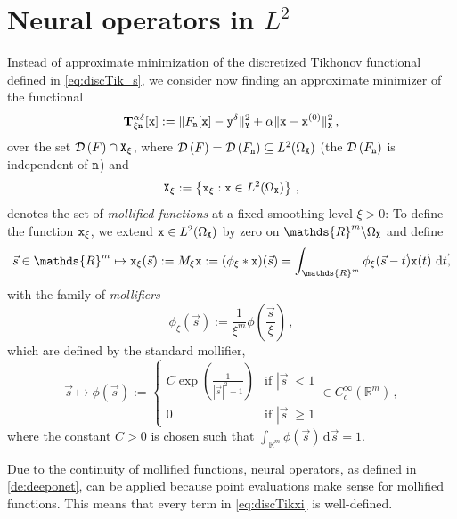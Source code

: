\documentclass[10pt]{article}
\numberwithin{equation}{section}
\theoremstyle{nonumberplain}
\newcommand{\R}{\mathds{R}}
\newcommand{\dom}[1]{\mathcal{D}\left(#1\right)}
\newcommand{\norms}[1]{\|#1\|}
\newcommand{\set}[1]{\left\{#1\right\}}
\renewcommand{\d}{\,\mathrm d}
\newcommand{\bs}{\vec{s}}
\newcommand{\bt}{\vec{t}}
\newcommand{\X}{{\tt X}}
\newcommand{\Y}{{\tt Y}}
\newcommand{\y}{{\tt y}}
\newcommand{\yd}{\y^\delta}
\newcommand{\n}{{\tt n}}
\newcommand{\x}{{\tt x}}
\newcommand{\Tik}{\mathbf{T}}
\begin{document}
\section{Neural operators in $L^2$} \label{se:generalization}
Instead of approximate minimization of the discretized Tikhonov functional defined in \autoref{eq:discTik_s}, we consider now finding an approximate minimizer of the functional
\begin{equation} \label{eq:discTikxi}
	\Tik_{\xi\n}^{\alpha\delta}[\x] := \norms{F_\n[\x]-\yd}_\Y^2 + \alpha\norms{\x-\x^{(0)}}^2_{\X}\,,
\end{equation} 
over the set $\dom{F} \cap \X_\xi$, where $\dom{F} = \dom{F_\n} \subseteq L^2(\Omega_\X)$ (the $\dom{F_\n}$ is independent of $\n$) and 
\begin{equation*}
	\X_\xi := \set{\x_\xi: \x \in L^2(\Omega_\X)}\,,
\end{equation*}
denotes the set of \emph{mollified functions} at a fixed smoothing level $\xi > 0$: To define the function $\x_\xi$, we extend $\x \in L^2(\Omega_\X)$ by zero on $\R^m\backslash\Omega_\X$ and define
\begin{equation}\label{def:mollifier}
	\bs \in \R^m \mapsto \x_\xi(\bs) := M_\xi\x:=(\phi_\xi*\x)(\bs) = \int_{\R^m} \phi_\xi(\bs - \bt)\x(\bt) \ \mathrm{d}\bt, 
\end{equation}
with the family of \emph{mollifiers}
$$\phi_\xi(\bs) := \frac{1}{\xi^m}\phi\left(\frac{\bs}{\xi}\right)\,,$$
which are defined by the standard mollifier,
\begin{equation*}
	\bs \mapsto \phi(\bs) := 
	\begin{cases}
		C \exp\left( \displaystyle\frac{1}{|\bs|^2 - 1} \right) & \text{if } |\bs| < 1 \\
		0 & \text{if } |\bs| \geq 1
	\end{cases} \in C_c^{\infty}(\R^m)\,,
\end{equation*}
where the constant $C>0$ is chosen such that $\int_{\R^m}\phi(\bs) \d \bs = 1.$

Due to the continuity of mollified functions, neural operators, as defined in \autoref{de:deeponet}, can be applied because point evaluations make sense for mollified functions. This means that every term in \autoref{eq:discTikxi} is well-defined.
\end{document}
